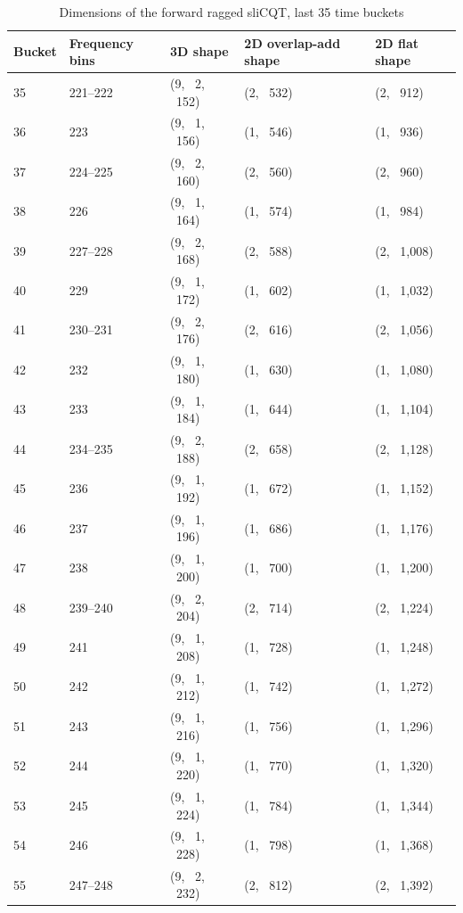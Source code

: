 \documentclass[report.tex]{subfiles}
\begin{document}
\begin{table}[ht]
	\centering
	\caption{Dimensions of the forward ragged sliCQT, last 35 time buckets}
	\label{table:slicqdim2}
	\begin{tabular}{ |l|l|l|l|l| }
	 \hline
		Bucket & Frequency bins & 3D shape & 2D overlap-add shape & 2D flat shape \\
	 \hline
	 \hline
35 & 221--222 & (9, \ 2, \ 152) & (2, \ 532) & (2, \ 912) \\
\hline
36 & 223 & (9, \ 1, \ 156) & (1, \ 546) & (1, \ 936) \\
\hline
37 & 224--225 & (9, \ 2, \ 160) & (2, \ 560) & (2, \ 960) \\
\hline
38 & 226 & (9, \ 1, \ 164) & (1, \ 574) & (1, \ 984) \\
\hline
39 & 227--228 & (9, \ 2, \ 168) & (2, \ 588) & (2, \ 1,008) \\
\hline
40 & 229 & (9, \ 1, \ 172) & (1, \ 602) & (1, \ 1,032) \\
\hline
41 & 230--231 & (9, \ 2, \ 176) & (2, \ 616) & (2, \ 1,056) \\
\hline
42 & 232 & (9, \ 1, \ 180) & (1, \ 630) & (1, \ 1,080) \\
\hline
43 & 233 & (9, \ 1, \ 184) & (1, \ 644) & (1, \ 1,104) \\
\hline
44 & 234--235 & (9, \ 2, \ 188) & (2, \ 658) & (2, \ 1,128) \\
\hline
45 & 236 & (9, \ 1, \ 192) & (1, \ 672) & (1, \ 1,152) \\
\hline
46 & 237 & (9, \ 1, \ 196) & (1, \ 686) & (1, \ 1,176) \\
\hline
47 & 238 & (9, \ 1, \ 200) & (1, \ 700) & (1, \ 1,200) \\
\hline
48 & 239--240 & (9, \ 2, \ 204) & (2, \ 714) & (2, \ 1,224) \\
\hline
49 & 241 & (9, \ 1, \ 208) & (1, \ 728) & (1, \ 1,248) \\
\hline
50 & 242 & (9, \ 1, \ 212) & (1, \ 742) & (1, \ 1,272) \\
\hline
51 & 243 & (9, \ 1, \ 216) & (1, \ 756) & (1, \ 1,296) \\
\hline
52 & 244 & (9, \ 1, \ 220) & (1, \ 770) & (1, \ 1,320) \\
\hline
53 & 245 & (9, \ 1, \ 224) & (1, \ 784) & (1, \ 1,344) \\
\hline
54 & 246 & (9, \ 1, \ 228) & (1, \ 798) & (1, \ 1,368) \\
\hline
55 & 247--248 & (9, \ 2, \ 232) & (2, \ 812) & (2, \ 1,392) \\

\end{tabular}
\end{table}
\end{document}
